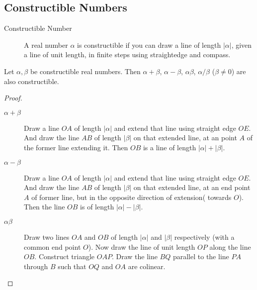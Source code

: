 \subsection{Constructible Numbers}
\begin{description}
	\item[Constructible Number] A real number $\alpha$ is constructible if you can draw a line of length $|\alpha|$, given a line of unit length, in finite steps using straightedge and compass.
\end{description}
\begin{theorem}
	Let $\alpha,\beta$ be constructible real numbers.
	Then $\alpha + \beta$, $\alpha-\beta$, $\alpha\beta$, $\alpha/\beta$ ($\beta \ne 0$) are also constructible.
\end{theorem}
\begin{proof}
\begin{description}
	\item[$\alpha+\beta$] Draw a line $OA$ of length $|\alpha|$ and extend that line using straight edge $OE$.
		And draw the line $AB$ of length $|\beta|$ on that extended line, at an point $A$ of the former line extending it.
		Then $OB$ is a line of length $|\alpha| + |\beta|$.
\begin{center}
\end{center}
	\item[$\alpha-\beta$] Draw a line $OA$ of length $|\alpha|$ and extend that line using straight edge $OE$.
		And draw the line $AB$ of length $|\beta|$ on that extended line, at an end point $A$ of former line, but in the opposite direction of extension( towards $O$).
		Then the line $OB$ is of length $|\alpha|-|\beta|$.
\begin{center}
\end{center}
	\item[$\alpha\beta$] Draw two lines $OA$ and $OB$ of length $|\alpha|$ and $|\beta|$ respectively (with a common end point $O$).
		Now draw the line of unit length $OP$ along the line $OB$.
		Construct triangle $OAP$.
		Draw the line $BQ$ parallel to the line $PA$ through $B$ such that $OQ$ and $OA$ are colinear.

\end{description}
\end{proof}
